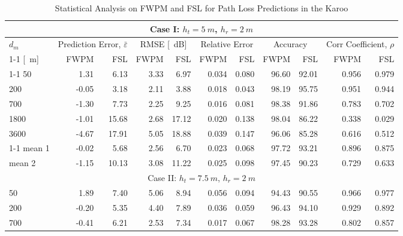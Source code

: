 \documentclass[10pt,journal,twoside]{IEEEtran}
\renewcommand{\arraystretch}{1.3}
\begin{document}
\begin{table}
	\centering
	\caption{Statistical Analysis on FWPM and FSL for Path Loss Predictions in the Karoo}
	\label{tb:stats2}
	\renewcommand{\arraystretch}{1.3}
	\setlength{\tabcolsep}{3pt}
	\begin{tabular*}{0.85\linewidth}{ @{\extracolsep{\fill}} l*{10}r @{}}\toprule
		\multicolumn{11}{c}{Case I: $h_t = \SI{5}{m}$, $h_r = \SI{2}{m}$} \\    \midrule
		$d_m$& \multicolumn{2}{c}{Prediction Error, $\bar\varepsilon$} & \multicolumn{2}{c}{RMSE [\SI{}{dB}]} & \multicolumn{2}{c}{Relative Error} & \multicolumn{2}{c}{Accuracy} & \multicolumn{2}{c}{Corr Coefficient, $\rho$} \\ \cmidrule{1-1} \cmidrule{2-3} \cmidrule{4-5} \cmidrule{6-7} \cmidrule{8-9} \cmidrule{10-11}
		[\SI{}{m}]     & FWPM  & FSL   & FWPM  & FSL   & FWPM  & FSL   & FWPM  & FSL   & FWPM  & FSL \\
		\cmidrule{1-1} \cmidrule{2-3} \cmidrule{4-5} \cmidrule{6-7} \cmidrule{8-9} \cmidrule{10-11}
        50    & 1.31  & 6.13  & 3.33  & 6.97  & 0.034 & 0.080 & 96.60 & 92.01 & 0.956 & 0.979 \\
        200   & -0.05 & 3.18  & 2.11  & 3.88  & 0.018 & 0.043 & 98.19 & 95.75 & 0.951 & 0.944 \\
        700   & -1.30 & 7.73  & 2.25  & 9.25  & 0.016 & 0.081 & 98.38 & 91.86 & 0.783 & 0.702 \\
        1800  & -1.01 & 15.68 & 2.68  & 17.12 & 0.020 & 0.138 & 98.04 & 86.22 & 0.338 & 0.029 \\
        3600  & -4.67 & 17.91 & 5.05  & 18.88 & 0.039 & 0.147 & 96.06 & 85.28 & 0.616 & 0.512 \\ \cmidrule{1-1} \cmidrule{2-3} \cmidrule{4-5} \cmidrule{6-7} \cmidrule{8-9} \cmidrule{10-11}
        mean 1 & -0.02 & 5.68  & 2.56  & 6.70  & 0.023 & 0.068 & 97.72 & 93.21 & 0.896 & 0.875 \\
        mean 2 & -1.15 & 10.13 & 3.08  & 11.22 & 0.025 & 0.098 & 97.45 & 90.23 & 0.729 & 0.633 \\ \midrule
		\multicolumn{11}{c}{Case II: $h_t = \SI{7.5}{m}$, $h_r = \SI{2}{m}$} \\ \midrule
		50    & 1.89  & 7.40  & 5.06  & 8.94  & 0.056 & 0.094 & 94.43 & 90.55 & 0.966 & 0.977 \\
        200   & -0.20 & 5.35  & 4.40  & 7.89  & 0.036 & 0.059 & 96.43 & 94.10 & 0.929 & 0.892 \\
        700   & -0.41 & 6.21  & 2.53  & 7.34  & 0.017 & 0.067 & 98.28 & 93.28 & 0.802 & 0.857 \\

\end{tabular*}
\end{table}
\end{document}
